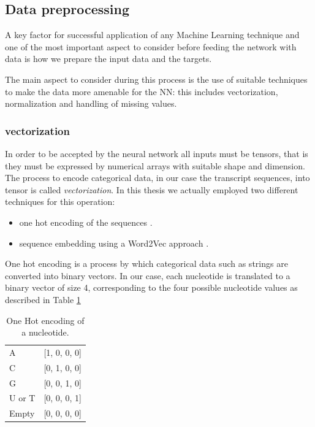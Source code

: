 \subsection{Data preprocessing}
A key factor for successful application of any Machine Learning technique and one of the most important aspect to consider before feeding the network with data is how we prepare the input data and the targets.  

The main aspect to consider during this process is the use of suitable techniques to make the data more amenable for the NN: this includes vectorization, normalization and handling of missing values. 
	

\subsubsection{vectorization}
In order to be accepted by the neural network all inputs must be tensors, that is they must be expressed by numerical arrays with suitable shape and dimension. The process to encode categorical data, in our case the transcript sequences, into tensor is called \emph{vectorization}. In this thesis we actually employed two different techniques for this operation: 

\begin{itemize} 
	\item one hot encoding of the sequences \cite{onehotencode}. 
	\item sequence embedding using a Word2Vec approach \cite{word2vec}. 
\end{itemize}

One hot encoding is a process by which categorical data such as strings are converted into binary vectors. In our case, each nucleotide is translated to a binary vector of size 4, corresponding to the four possible nucleotide values as described in Table \ref{tab:ohe} 

\begin{table}[!b]
	\caption{One Hot encoding of a nucleotide.}
	\label{tab:ohe}
	\centering
	\begin{tabular}{l l}
		\toprule
		\tabhead{Nucleotide} & \tabhead{Encoding} \\
		\midrule
		A & [1, 0, 0, 0]\\
		C & [0, 1, 0, 0]\\
		G & [0, 0, 1, 0]\\
		U or T & [0, 0, 0, 1]\\
		Empty & [0, 0, 0, 0]\\
		\bottomrule
	\end{tabular}
\end{table}

